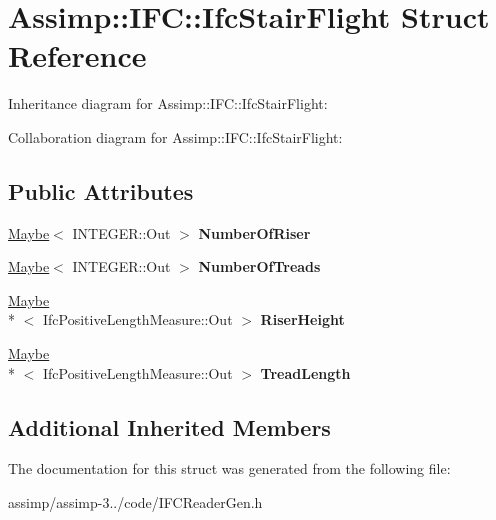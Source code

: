 \hypertarget{struct_assimp_1_1_i_f_c_1_1_ifc_stair_flight}{\section{Assimp\+:\+:I\+F\+C\+:\+:Ifc\+Stair\+Flight Struct Reference}
\label{struct_assimp_1_1_i_f_c_1_1_ifc_stair_flight}
}


Inheritance diagram for Assimp\+:\+:I\+F\+C\+:\+:Ifc\+Stair\+Flight\+:


Collaboration diagram for Assimp\+:\+:I\+F\+C\+:\+:Ifc\+Stair\+Flight\+:
\subsection*{Public Attributes}
\begin{DoxyCompactItemize}
\item 
\hypertarget{struct_assimp_1_1_i_f_c_1_1_ifc_stair_flight_ae69d1cfacd279925d1d4e0afe4f14906}{\hyperlink{struct_assimp_1_1_s_t_e_p_1_1_maybe}{Maybe}$<$ I\+N\+T\+E\+G\+E\+R\+::\+Out $>$ {\bfseries Number\+Of\+Riser}}\label{struct_assimp_1_1_i_f_c_1_1_ifc_stair_flight_ae69d1cfacd279925d1d4e0afe4f14906}

\item 
\hypertarget{struct_assimp_1_1_i_f_c_1_1_ifc_stair_flight_af22afe5cbabe35dddbc3f3dc2b0c9d19}{\hyperlink{struct_assimp_1_1_s_t_e_p_1_1_maybe}{Maybe}$<$ I\+N\+T\+E\+G\+E\+R\+::\+Out $>$ {\bfseries Number\+Of\+Treads}}\label{struct_assimp_1_1_i_f_c_1_1_ifc_stair_flight_af22afe5cbabe35dddbc3f3dc2b0c9d19}

\item 
\hypertarget{struct_assimp_1_1_i_f_c_1_1_ifc_stair_flight_aefe07c21b16f7fb9370d11e6b2aa4f5c}{\hyperlink{struct_assimp_1_1_s_t_e_p_1_1_maybe}{Maybe}\\*
$<$ Ifc\+Positive\+Length\+Measure\+::\+Out $>$ {\bfseries Riser\+Height}}\label{struct_assimp_1_1_i_f_c_1_1_ifc_stair_flight_aefe07c21b16f7fb9370d11e6b2aa4f5c}

\item 
\hypertarget{struct_assimp_1_1_i_f_c_1_1_ifc_stair_flight_aad21f5e3ef6e61a8af9e483e0b7afe08}{\hyperlink{struct_assimp_1_1_s_t_e_p_1_1_maybe}{Maybe}\\*
$<$ Ifc\+Positive\+Length\+Measure\+::\+Out $>$ {\bfseries Tread\+Length}}\label{struct_assimp_1_1_i_f_c_1_1_ifc_stair_flight_aad21f5e3ef6e61a8af9e483e0b7afe08}

\end{DoxyCompactItemize}
\subsection*{Additional Inherited Members}


The documentation for this struct was generated from the following file\+:\begin{DoxyCompactItemize}
\item 
assimp/assimp-\/3../code/I\+F\+C\+Reader\+Gen.\+h\end{DoxyCompactItemize}
